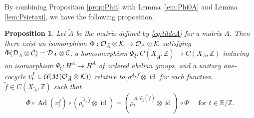 \documentclass[11pt]{article}
\newtheorem{proposition}[theorem]{Proposition}
\theoremstyle{plain}
\theoremstyle{definition}
\numberwithin{equation}{section}
\newcommand{\id}{\operatorname{id}}
\newcommand{\Ad}{\operatorname{Ad}}
\newcommand{\N}{\mathbb{N}}
\newcommand{\RZ}{\mathbb{R}/{\mathbb{Z}}}
\newcommand{\Z}{\mathbb{Z}}
\newcommand{\f}{\tilde{f}}
\begin{document}
By combining 
Proposition \ref{prop:Phit} 
with
Lemma \ref{lem:Phi0A} and Lemma \ref{lem:Psietaxi},
we have the following proposition.
\begin{proposition} \label{prop:tildeA}
Let $\tilde{A}$ be the matrix defined by \eqref{eq:tildeA}
for a matrix $A$.
Then there exist an isomorphism
$\Phi:{{\mathcal{O}}_{\tilde{A}}\otimes{\mathcal{K}}} 
\rightarrow 
{{\mathcal{O}}_A}\otimes{\mathcal{K}}$ 
satisfying  
$\Phi({{\mathcal{D}}_{\tilde{A}}\otimes{\mathcal{C}}}) = {{\mathcal{D}}_A}\otimes{\mathcal{C}}$,
a homomorphism 
$\Psi_\xi :C(X_{\tilde{A}},\Z) \rightarrow C(X_A,\Z)$
inducing an isomorphism
$\bar{\Psi}_\xi: H^{\tilde{A}} \rightarrow H^A$
of ordered abelian groups, 
and
a unitary one-cocycle
 $v_t^{\f} \in \U(M(\SOTA))$ relative to 
$\rho^{\tilde{A},\f} \otimes\id$
 for each  function
$\f\in C(X_{\tilde{A}},\Z)$
such that  
\begin{equation*}
\Phi \circ \Ad(v_t^{\f}) \circ (\rho^{\tilde{A},\f}_t\otimes \id)
 = (\rho^{A,\Psi_\xi(\f)}_t\otimes\id) \circ {\Phi}
\quad
\text{ for }
 t \in \RZ.
\end{equation*}
\end{proposition}
\end{document}
